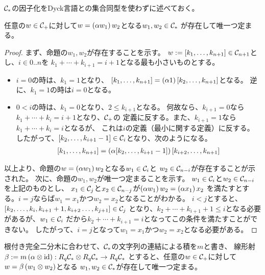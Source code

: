 {	${{\mathcal{C}}}_*$の因子化をDyck言語との集合同型を使わずに述べておく。

	\begin{proposition}[Cの因子化]\label{prop:Cの因子化} %
		任意の$w\in{\ensuremath{{\mathcal{C}}}}_+$に対して$w=\left({\alpha w_1}\right)w_2$となる$w_1,w_2\in{\ensuremath{{\mathcal{C}}}}_*$
		が存在して唯一つ定まる。
	\end{proposition} %
	\begin{proof} %
		まず、命題の$w_1,w_2$が存在することを示す。
		$w:=[k_1,\dots,k_{n+1}]\in{\ensuremath{{\mathcal{C}}}}_{n+1}$とし、$i\in0..n$を
		$k_1+\cdots+k_{i+1}=i+1$となる最も小さいものとする。
		\begin{itemize}\setlength{\itemsep}{-1mm} %
			\item $i=0$の時は、$k_1=1$となり、
			$[k_1,\dots,k_{n+1}]=\left({\alpha 1}\right)[k_2,\dots,k_{n+1}]$となる。
			逆に、$k_1=1$の時は$i=0$となる。
			\item $0<i$の時は、$k_1=0$となり、$2\le k_{i+1}$となる。
			何故なら、$k_{i+1}=0$なら$k_1+\cdots+k_i=i+1$となり、${{\mathcal{C}}}_+$の
			定義に反する。また、$k_{i+1}=1$なら$k_1+\cdots+k_i=i$となるが、
			これは$i$の定義（最小に関する定義）に反する。
			したがって、$[k_2,\dots,k_{i+1}-1]\in{\ensuremath{{\mathcal{C}}}}_i$となり、次のようになる。
			\begin{equation*}\begin{split}
				[k_1,\dots,k_{n+1}] = \left({\alpha[k_2,\dots,k_{i+1}-1]}\right)
					[k_{i+2},\dots,k_{n+1}]
			\end{split}\end{equation*}
		\end{itemize} %
		以上より、命題の$w=\left({\alpha w_1}\right)w_2$となる$w_1\in{\ensuremath{{\mathcal{C}}}}_i$と
		$w_2\in{\ensuremath{{\mathcal{C}}}}_{n-i}$が存在することが示された。
		次に、命題の$w_1,w_2$が唯一つ定まることを示す。
		$w_1\in{\ensuremath{{\mathcal{C}}}}_i$と$w_2\in{\ensuremath{{\mathcal{C}}}}_{n-i}$を上記のものとし、
		$x_1\in{\ensuremath{{\mathcal{C}}}}_j$と$x_2\in{\ensuremath{{\mathcal{C}}}}_{n-j}$が$\left({\alpha w_1}\right)w_2=\left({\alpha x_1}\right)x_2$
		を満たすとする。$i=j$ならば$w_1=x_1$かつ$w_2=x_2$となることがわかる。
		$i<j$とすると、$[k_2,\dots,k_i,k_{i+1}+1,k_{i+2}\dots,k_{j+1}]\in{\ensuremath{{\mathcal{C}}}}_j$
		となり、$k_2+\cdots+k_{i+1}+1\le i$となる必要があるが、$w_1\in{\ensuremath{{\mathcal{C}}}}_i$
		だから$k_2+\cdots+k_{i+1}=i$となってこの条件を満たすことができない。
		したがって、$i=j$となって$w_1=x_1$かつ$w_2=x_2$となる必要がある。
	\end{proof} %

	根付き完全二分木に合わせて、${{\mathcal{C}}}_*$の文字列の連結による積を$m$と書き、
	線形射$\beta:=m\left({\alpha\otimes{\ensuremath{\operatorname{id}}}}\right):R_q{{\mathcal{C}}}_*\otimes R_q{{\mathcal{C}}}_*\to R_q{{\mathcal{C}}}_*$
	とすると、任意の$w\in{\ensuremath{{\mathcal{C}}}}_+$に対して$w=\beta\left({w_1\otimes w_2}\right)$となる
	$w_1,w_2\in{\ensuremath{{\mathcal{C}}}}_*$が存在して唯一つ定まる。

}

